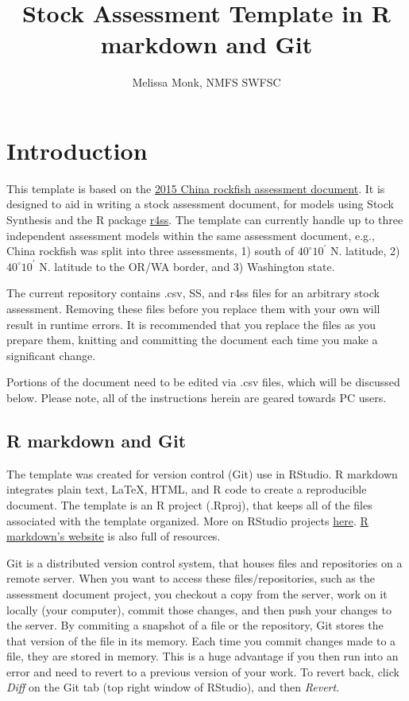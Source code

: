 \documentclass[12pt,]{article}
\title{Stock Assessment Template in R markdown and Git}
\author{Melissa Monk, NMFS SWFSC}
\date{}
\begin{document}
\maketitle

{
\setcounter{tocdepth}{3}
\tableofcontents
}
\newpage

\section{Introduction}\label{introduction}

This template is based on the
\href{http://www.pcouncil.org/wp-content/uploads/2015/08/H3_Att3_China_FULLAssmt_E-Only_SEPT2015BB.pdf}{2015
China rockfish assessment document}. It is designed to aid in writing a
stock assessment document, for models using Stock Synthesis and the R
package \href{https://github.com/r4ss/r4ss}{r4ss}. The template can
currently handle up to three independent assessment models within the
same assessment document, e.g., China rockfish was split into three
assessments, 1) south of \(40^\circ 10^\prime\) N. latitude, 2)
\(40^\circ 10^\prime\) N. latitude to the OR/WA border, and 3)
Washington state.

The current repository contains .csv, SS, and r4ss files for an
arbitrary stock assessment. Removing these files before you replace them
with your own will result in runtime errors. It is recommended that you
replace the files as you prepare them, knitting and committing the
document each time you make a significant change.

Portions of the document need to be edited via .csv files, which will be
discussed below. Please note, all of the instructions herein are geared
towards PC users.

\subsection{R markdown and Git}\label{r-markdown-and-git}

The template was created for version control (Git) use in RStudio. R
markdown integrates plain text, \LaTeX, HTML, and R code to create a
reproducible document. The template is an R project (.Rproj), that keeps
all of the files associated with the template organized. More on RStudio
projects
\href{https://support.rstudio.com/hc/en-us/articles/200526207-Using-Projects}{here}.
\href{http://rmarkdown.rstudio.com/}{R markdown's website} is also full
of resources.

Git is a distributed version control system, that houses files and
repositories on a remote server. When you want to access these
files/repositories, such as the assessment document project, you
checkout a copy from the server, work on it locally (your computer),
commit those changes, and then push your changes to the server. By
commiting a snapshot of a file or the repository, Git stores the that
version of the file in its memory. Each time you commit changes made to
a file, they are stored in memory. This is a huge advantage if you then
run into an error and need to revert to a previous version of your work.
To revert back, click \emph{Diff} on the Git tab (top right window of
RStudio), and then \emph{Revert}.
\end{document}
